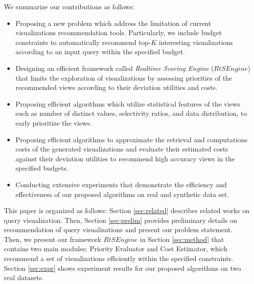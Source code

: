 We summarize our contributions as follows:
%
\begin{itemize}
	\item Proposing a new problem which address the limitation of current visualizations recommendation tools. Particularly, we include budget constraints to automatically
	 recommend top-$K$ interesting visualizations according to an input query within the specified budget.
	 \item Designing an efficient framework called \emph{Realtime Scoring Engine} ($RtSEngine$)
 that limits the exploration of visualizations by assessing priorities of the 
 recommended views according to their deviation utilities and costs.
	\item Proposing efficient algorithms which utilize statistical features of the views such as number 
	of distinct values, selectivity ratios, and data distribution, to early prioritize the views.
	\item Proposing efficient algorithms to approximate the retrieval and computations costs of the generated 
	visualizations and evaluate their estimated costs against their deviation 
	utilities to recommend high accuracy views in the specified budgets.  
	\item Conducting extensive experiments that demonstrate the efficiency and effectiveness of our proposed algorithms on real and synthetic data set.
\end{itemize}
%
This paper is organized as follows: Section \ref{sec:related} describes related works on query visualization. 
%
Then, Section \ref{sec:prelim} provides preliminary details on recommendation of query visualizations and present our problem statement. 
%
Then, we present our framework $RtSEngine$ in Section \ref{sec:method} that contains two main modules: Priority Evaluator and Cost Estimator, which recommend a set of visualizations efficiently within the specified constraints. 
%
Section \ref{sec:expr} shows experiment results for our proposed algorithms on two real datasets. 
%